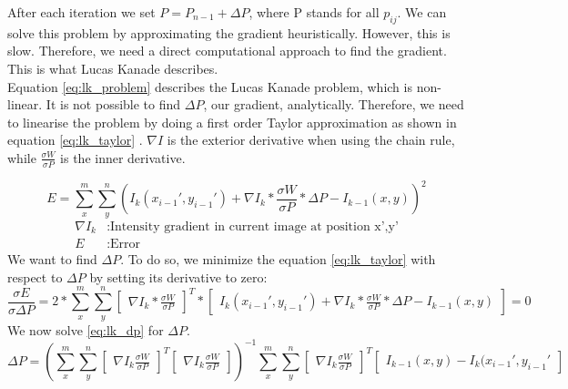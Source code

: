 \documentclass[11pt,a4paper,titlepage,oneside]{report}
\begin{document}
After each iteration we set $P=P_{n-1}+\Delta P$, where P stands for all $p_{ij}$. We can solve this problem by approximating the gradient heuristically. However, this is slow. Therefore, we need a direct computational approach to find the gradient. This is what Lucas Kanade describes.\\
Equation \ref{eq:lk_problem} describes the Lucas Kanade problem, which is non-linear. It is not possible to find $\Delta P$, our gradient, analytically. Therefore, we need to linearise the problem by doing a first order Taylor approximation as shown in equation \ref{eq:lk_taylor} \cite{taylor_series}. $\nabla I$ is the exterior derivative when using the chain rule, while $\frac{\sigma W}{\sigma P}$ is the inner derivative. 

\begin{equation}\label{eq:lk_taylor}
  E=\sum_x^m\sum_y^n(I_{k}(x_{i-1}',y_{i-1}')+\nabla I_{k}*\frac{\sigma W}{\sigma P}*\Delta P-I_{k-1}(x,y))^2
\end{equation}
\begin{align*}
  \nabla I_k  &: \text{Intensity gradient in current image at position x',y'}\\
  E           &: \text{Error} 
\end{align*}
We want to find $\Delta P$. To do so, we minimize the equation \ref{eq:lk_taylor} with respect to $\Delta P$ by setting its derivative to zero:
\tiny
\begin{equation}
  \frac{\sigma E}{\sigma \Delta P}=2*\sum_x^m\sum_y^n\begin{bmatrix}\nabla I_{k}*\frac{\sigma W}{\sigma P}\end{bmatrix}^T*\begin{bmatrix}I_{k}(x_{i-1}',y_{i-1}')+\nabla I_{k}*\frac{\sigma W}{\sigma P}*\Delta P-I_{k-1}(x,y)\end{bmatrix}=0
\end{equation}
\normalsize
We now solve \ref{eq:lk_dp} for $\Delta P$.
\tiny
\begin{equation}\label{eq:lk_dp}
  \Delta P=(\sum_x^m\sum_y^n\begin{bmatrix}\nabla I_{k}\frac{\sigma W}{\sigma P}\end{bmatrix}^T\begin{bmatrix}\nabla I_{k}\frac{\sigma W}{\sigma P}\end{bmatrix})^{-1}
  \sum_x^m\sum_y^n\begin{bmatrix}\nabla I_{k}\frac{\sigma W}{\sigma P}\end{bmatrix}^T\begin{bmatrix}I_{k-1}(x,y) - I_{k}(x_{i-1}',y_{i-1}'\end{bmatrix}
\end{equation}
\normalsize
\end{document}
